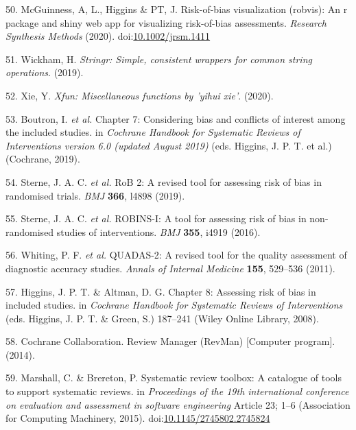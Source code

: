 \documentclass[a4paper, twoside]{templates/ociamthesis}
\begin{document}
\leavevmode\hypertarget{ref-robvis}{}%
50. McGuinness, A, L., Higgins \& PT, J. Risk-of-bias visualization (robvis): An r package and shiny web app for visualizing risk-of-bias assessments. \emph{Research Synthesis Methods} (2020). doi:\href{https://doi.org/10.1002/jrsm.1411}{10.1002/jrsm.1411}

\leavevmode\hypertarget{ref-stringr}{}%
51. Wickham, H. \emph{Stringr: Simple, consistent wrappers for common string operations}. (2019).

\leavevmode\hypertarget{ref-xfun}{}%
52. Xie, Y. \emph{Xfun: Miscellaneous functions by 'yihui xie'}. (2020).

\leavevmode\hypertarget{ref-cochranechpt7}{}%
53. Boutron, I. \emph{et al.} Chapter 7: Considering bias and conflicts of interest among the included studies. in \emph{Cochrane Handbook for Systematic Reviews of Interventions version 6.0 (updated August 2019)} (eds. Higgins, J. P. T. et al.) (Cochrane, 2019).

\leavevmode\hypertarget{ref-sterne2019rob}{}%
54. Sterne, J. A. C. \emph{et al.} RoB 2: A revised tool for assessing risk of bias in randomised trials. \emph{BMJ} \textbf{366}, l4898 (2019).

\leavevmode\hypertarget{ref-sterne2016robins}{}%
55. Sterne, J. A. C. \emph{et al.} ROBINS-I: A tool for assessing risk of bias in non-randomised studies of interventions. \emph{BMJ} \textbf{355}, i4919 (2016).

\leavevmode\hypertarget{ref-whiting2011quadas}{}%
56. Whiting, P. F. \emph{et al.} QUADAS-2: A revised tool for the quality assessment of diagnostic accuracy studies. \emph{Annals of Internal Medicine} \textbf{155}, 529--536 (2011).

\leavevmode\hypertarget{ref-higgins2008assessing}{}%
57. Higgins, J. P. T. \& Altman, D. G. Chapter 8: Assessing risk of bias in included studies. in \emph{Cochrane Handbook for Systematic Reviews of Interventions} (eds. Higgins, J. P. T. \& Green, S.) 187--241 (Wiley Online Library, 2008).

\leavevmode\hypertarget{ref-cochrane2014review}{}%
58. Cochrane Collaboration. Review Manager (RevMan) {[}Computer program{]}. (2014).

\leavevmode\hypertarget{ref-marshall2015systematic}{}%
59. Marshall, C. \& Brereton, P. Systematic review toolbox: A catalogue of tools to support systematic reviews. in \emph{Proceedings of the 19th international conference on evaluation and assessment in software engineering} Article 23; 1--6 (Association for Computing Machinery, 2015). doi:\href{https://doi.org/10.1145/2745802.2745824}{10.1145/2745802.2745824}
\end{document}
